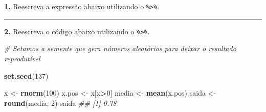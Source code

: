 \documentclass[]{book}
\newenvironment{Shaded}{\begin{snugshade}}{\end{snugshade}}
\newcommand{\CommentTok}[1]{\textcolor[rgb]{0.56,0.35,0.01}{\textit{#1}}}
\newcommand{\DataTypeTok}[1]{\textcolor[rgb]{0.13,0.29,0.53}{#1}}
\newcommand{\DecValTok}[1]{\textcolor[rgb]{0.00,0.00,0.81}{#1}}
\newcommand{\KeywordTok}[1]{\textcolor[rgb]{0.13,0.29,0.53}{\textbf{#1}}}
\newcommand{\NormalTok}[1]{#1}
\newcommand{\OperatorTok}[1]{\textcolor[rgb]{0.81,0.36,0.00}{\textbf{#1}}}
\newcommand{\StringTok}[1]{\textcolor[rgb]{0.31,0.60,0.02}{#1}}
\begin{document}
\textbf{1.} Reescreva a expressão abaixo utilizando o \texttt{\%\textgreater{}\%}.

\begin{Shaded}
\end{Shaded}

\begin{center}\rule{0.5\linewidth}{\linethickness}\end{center}

\textbf{2.} Reescreva o código abaixo utilizando o \texttt{\%\textgreater{}\%}.

\begin{Shaded}
\begin{Highlighting}[]
\CommentTok{# Setamos a semente que gera números aleatórios para deixar o resultado reprodutível}

\KeywordTok{set.seed}\NormalTok{(}\DecValTok{137}\NormalTok{)}

\NormalTok{x <-}\StringTok{ }\KeywordTok{rnorm}\NormalTok{(}\DecValTok{100}\NormalTok{)}
\NormalTok{x.pos <-}\StringTok{ }\NormalTok{x[x}\OperatorTok{>}\DecValTok{0}\NormalTok{]}
\NormalTok{media <-}\StringTok{ }\KeywordTok{mean}\NormalTok{(x.pos)}
\NormalTok{saida <-}\StringTok{ }\KeywordTok{round}\NormalTok{(media, }\DecValTok{2}\NormalTok{)}
\NormalTok{saida}
\CommentTok{## [1] 0.78}
\end{Highlighting}
\end{Shaded}

\begin{Shaded}
\end{Shaded}
\end{document}
